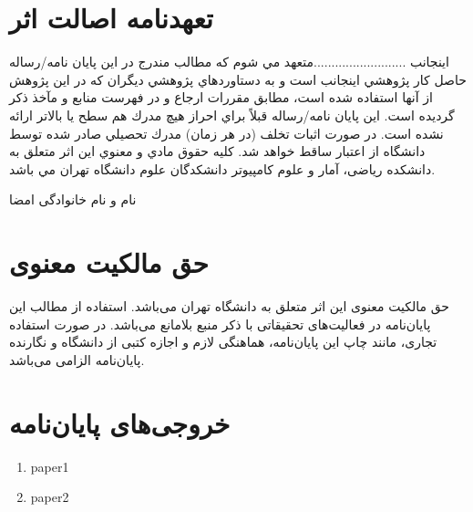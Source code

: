 \documentclass[12pt]{report}
\begin{document}
\chapter*{تعهدنامه اصالت اثر}
اينجانب  ..........................متعهد مي شوم كه مطالب مندرج در اين پايان نامه/رساله حاصل كار پژوهشي اينجانب است و به دستاوردهاي پژوهشي ديگران كه در اين پژوهش از آنها استفاده شده است، مطابق مقررات ارجاع و در فهرست منابع و مآخذ ذكر گرديده است. اين پايان نامه/رساله قبلاً براي احراز هيچ مدرك هم سطح يا بالاتر ارائه نشده است. در صورت اثبات تخلف (در هر زمان) مدرك تحصيلي صادر شده توسط دانشگاه از اعتبار ساقط خواهد شد. 
كليه حقوق مادي و معنوي اين اثر متعلق به دانشكده ریاضی، آمار و علوم کامپیوتر دانشکدگان علوم دانشگاه تهران مي باشد. 
\begin{flushleft}
نام و نام خانوادگی
امضا 
\end{flushleft}

\chapter*{حق مالکیت معنوی}
حق مالکیت معنوی این اثر متعلق به دانشگاه تهران می‌باشد. استفاده از مطالب این پایان‌نامه در فعالیت‌های تحقیقاتی با ذکر منبع بلامانع می‌باشد. در صورت استفاده تجاری، مانند چاپ این پایان‌نامه، هماهنگی لازم و اجازه کتبی از دانشگاه و نگارنده پایان‌نامه الزامی می‌باشد.
\chapter*{خروجی‌های پايان‌نامه}
\begin{latin}
\begin{enumerate}
\item 
paper1
\item 
paper2
\end{enumerate}
\end{latin}


\end{document}
